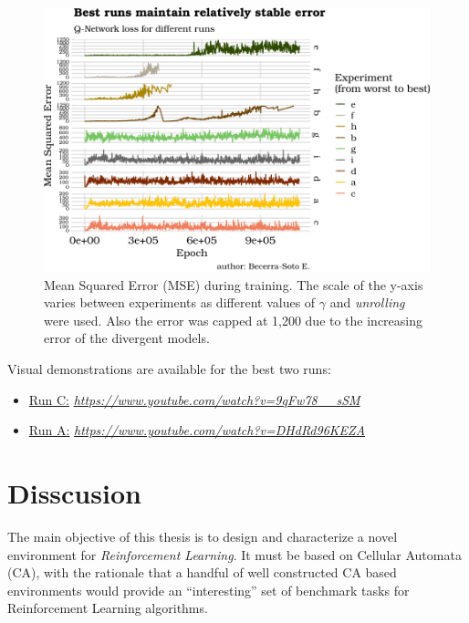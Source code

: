 \documentclass[
  openany]{book}
\providecommand{\tightlist}{%
  \setlength{\itemsep}{0pt}\setlength{\parskip}{0pt}}
\begin{document}
\begin{figure}

{\centering \includegraphics{_main_files/figure-latex/loss-1} 

}

\caption{Mean Squared Error (MSE) during training. The scale of the y-axis varies between experiments as different values of \(\gamma\) and \emph{unrolling} were used. Also the error was capped at 1,200 due to the increasing error of the divergent models.}\label{fig:loss}
\end{figure}

Visual demonstrations are available for the best two runs:

\begin{itemize}
\tightlist
\item
  \href{https://www.youtube.com/watch?v=9qFw78__sSM}{Run C:} \emph{\url{https://www.youtube.com/watch?v=9qFw78__sSM}}
\item
  \href{https://www.youtube.com/watch?v=DHdRd96KEZA}{Run A:} \emph{\url{https://www.youtube.com/watch?v=DHdRd96KEZA}}
\end{itemize}

\hypertarget{disscusion}{%
\section{Disscusion}\label{disscusion}}

The main objective of this thesis is to design and characterize a novel environment for \emph{Reinforcement Learning}. It must be based on Cellular Automata (CA), with the rationale that a handful of well constructed CA based environments would provide an ``interesting'' set of benchmark tasks for Reinforcement Learning algorithms.
\end{document}

